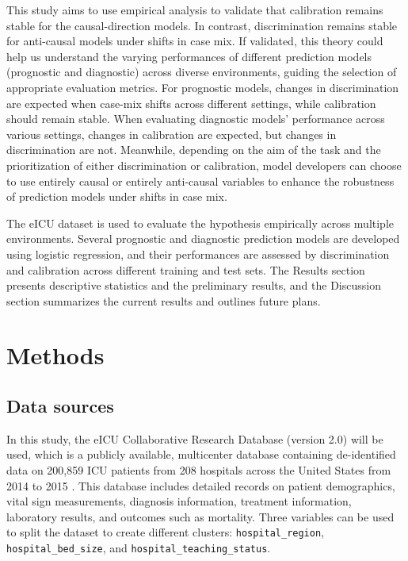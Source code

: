 \documentclass[10.7pt,]{article}
\begin{document}
This study aims to use empirical analysis to validate that calibration remains stable for the causal-direction models. In contrast, discrimination remains stable for anti-causal models under shifts in case mix. If validated, this theory could help us understand the varying performances of different prediction models (prognostic and diagnostic) across diverse environments, guiding the selection of appropriate evaluation metrics. For prognostic models, changes in discrimination are expected when case-mix shifts across different settings, while calibration should remain stable. When evaluating diagnostic models’ performance across various settings, changes in calibration are expected, but changes in discrimination are not. Meanwhile, depending on the aim of the task and the prioritization of either discrimination or calibration, model developers can choose to use entirely causal or entirely anti-causal variables to enhance the robustness of prediction models under shifts in case mix.

The eICU dataset is used to evaluate the hypothesis empirically across multiple environments. Several prognostic and diagnostic prediction models are developed using logistic regression, and their performances are assessed by discrimination and calibration across different training and test sets. The Results section presents descriptive statistics and the preliminary results, and  the Discussion section summarizes the current results and outlines future plans.



\section{Methods}\label{methods}

\subsection{Data sources}\label{data-sources}

In this study, the eICU Collaborative Research Database (version 2.0) \cite{7} will be used, which is a publicly available, multicenter database containing de-identified data on 200,859 ICU patients from 208 hospitals across the United States from 2014 to 2015 \cite{8}. This database includes detailed records on patient demographics, vital sign measurements, diagnosis information, treatment information, laboratory results, and outcomes such as mortality. Three variables can be used to split the dataset to create different clusters: \texttt{hospital\_region}, \texttt{hospital\_bed\_size}, and \texttt{hospital\_teaching\_status}.
\end{document}
